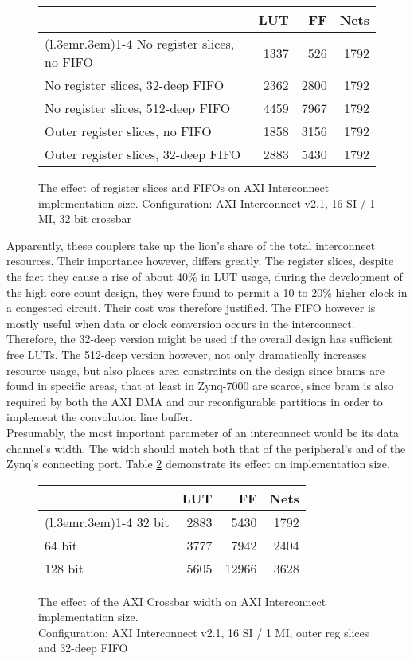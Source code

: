 \begin{figure}[ht!]
\centering
\begin{tabular}{lrrr}
\toprule
	& LUT	& FF	& Nets \\
\cmidrule(l{.3em}r{.3em}){1-4}
No register slices, no FIFO		& 1337 & 526 & 1792 \\
No register slices, 32-deep FIFO	& 2362 & 2800 & 1792 \\
No register slices, 512-deep FIFO	& 4459 & 7967 & 1792 \\
Outer register slices, no FIFO		& 1858 & 3156 & 1792 \\
Outer register slices, 32-deep FIFO	& 2883 & 5430 & 1792 \\
\bottomrule
\end{tabular}
\caption{The effect of register slices and FIFOs on AXI Interconnect implementation size.
	Configuration: AXI Interconnect v2.1, 16 SI / 1 MI, 32 bit crossbar}
\label{tab:int-reg}
\end{figure}

Apparently, these couplers take up the lion's share of the total interconnect resources.
Their importance however, differs greatly.
The register slices, despite the fact they cause a rise of about 40\% in LUT usage,
during the development of the high core count design,
they were found to permit a 10 to 20\% higher clock in a congested circuit.
Their cost was therefore justified.
The FIFO however is mostly useful when data or clock conversion occurs in the
interconnect. Therefore, the 32-deep version might be used if the overall design
has sufficient free LUTs. The 512-deep version however,
not only dramatically increases resource usage, but also places area constraints on
the design since \glspl{bram} are found in specific areas, that at least in Zynq-7000
are scarce, since \gls{bram} is also required by both the AXI DMA and our reconfigurable
partitions in order to implement the convolution line buffer.
\\

Presumably, the most important parameter of an interconnect would be its data channel's width.
The width should match both that of the peripheral's and of the Zynq's connecting port.
Table \ref{tab:int-width} demonstrate its effect on implementation size.

\begin{figure}[ht!]
\centering
\begin{tabular}{lrrr}
\toprule
	& LUT	& FF	& Nets \\
\cmidrule(l{.3em}r{.3em}){1-4}
32 bit	& 2883	& 5430	& 1792 \\
64 bit	& 3777	& 7942	& 2404 \\
128 bit	& 5605	& 12966	& 3628 \\
\bottomrule
\end{tabular}
\caption{The effect of the AXI Crossbar width on AXI Interconnect implementation size.\\
	Configuration: AXI Interconnect v2.1, 16 SI / 1 MI, outer reg slices and 32-deep FIFO}
\label{tab:int-width}
\end{figure}

